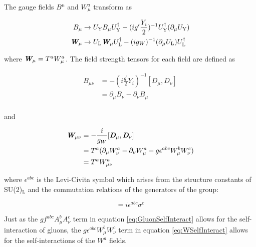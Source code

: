 \documentclass[12pt,a4paper,epsf,portrait,times,epsfig]{report}
\begin{document}
	The gauge fields $B^{\mu}$ and $W_{\mu}^{a}$ transform as

	\begin{align}
		B_{\mu} &\rightarrow U_{\mathrm{Y}}B_{\mu}U_{\mathrm{Y}}^{\dagger}-(ig^{\prime}\frac{Y_{i}}{2})^{-1}U_{\mathrm{Y}}^{\dagger}(\partial_{\mu}U_{\mathrm{Y}}) \\
		\textit{\textbf{W}}_{\mu} &\rightarrow U_{\mathrm{L}}\textit{\textbf{W}}_{\mu}U_{\mathrm{L}}^{\dagger}-(ig_{W})^{-1}(\partial_{\mu}U_{\mathrm{L}})U_{\mathrm{L}}^{\dagger}
	\end{align}

	where $\textit{\textbf{W}}_{\mu} = T^{a}W_{\mu}^{a}$. The field strength tensors for each field are defined as

	\begin{equation}
		\begin{split}
		B_{\mu\nu} &= -(i\frac{g^{\prime}}{2}Y_{i})^{-1}[D_{\mu},D_{\nu}] \\
		&= \partial_{\mu}B_{\nu} - \partial_{\nu}B_{\mu} \\
		\end{split}
	\end{equation}

	and

	\begin{equation} \label{eq:WSelfInteract}
		\begin{split}
			\textit{\textbf{W}}_{\mu\nu} &= -\frac{i}{g_{W}}[\textit{\textbf{D}}_{\mu},\textit{\textbf{D}}_{\nu}] \\
			&= T^{a}(\partial_{\mu}W_{\nu}^{a}-\partial_{\nu}W_{\mu}^{a}-g\epsilon^{abc}W_{\mu}^{b}W_{\nu}^{c}) \\
			&= T^{a}W_{\mu\nu}^{a} \\
		\end{split}
	\end{equation}

	where $\epsilon^{abc}$ is the Levi-Civita symbol which arises from the structure constants of SU(2)$_{\mathrm{L}}$ and the commutation relations of the generators of the group:

	\begin{equation}
		[\sigma^{a},\sigma^{b}]=i\epsilon^{abc}\sigma^{c}
	\end{equation}

	Just as the $gf^{abc}A_{\mu}^{b}A_{\nu}^{c}$ term in equation \ref{eq:GluonSelfInteract} allows for the self-interaction of gluons, the $g\epsilon^{abc}W_{\mu}^{b}W_{\nu}^{c}$ term in equation \ref{eq:WSelfInteract} allows for the self-interactions of the $W^{a}$ fields. \par
\end{document}
